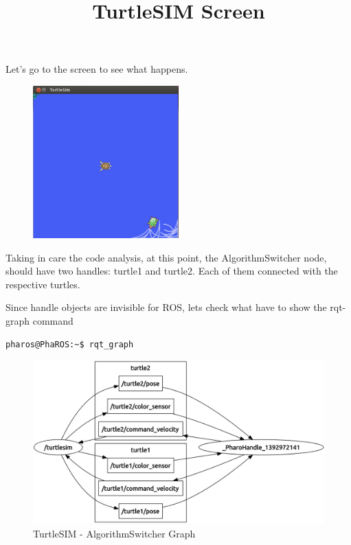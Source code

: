 \documentclass[a4paper,10pt,twoside]{book}
\begin{document}
			
			
			Let's go to the screen to see what happens.
			
			\begin{figure}[!htbp]
  		
  				\centering
    				\includegraphics[width=0.5\textwidth]{TurtleSIM1Quiet1Random.png}
				
				\centering
				\title{TurtleSIM Screen}
			\end{figure}
			
			\newpage
			
			
			
			Taking in care the code analysis, at this point, the AlgorithmSwitcher node, should have two handles: turtle1 and turtle2. Each of them connected with the respective turtles. 
			
			Since handle objects are invisible for ROS, lets check what have to show the rqt-graph command 
			
			
			\begin{lstlisting}[language=bash,title={Analysing graph topology}]
				pharos@PhaROS:~$ rqt_graph
			\end{lstlisting}


			\begin{figure}[!htbp]
  				\centering
    				\includegraphics[width=1\textwidth]{TurtleSIMGraph2.png}
				\centering
				
				\caption{TurtleSIM - AlgorithmSwitcher Graph \label{img:TurtleSIMGraph2} }
			\end{figure}
\end{document}
